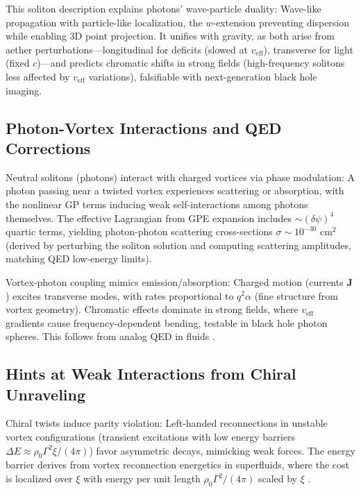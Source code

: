 \documentclass{article}
\begin{document}
This soliton description explains photons' wave-particle duality: Wave-like propagation with particle-like localization, the $w$-extension preventing dispersion while enabling 3D point projection. It unifies with gravity, as both arise from aether perturbations---longitudinal for deficits (slowed at $v_{\text{eff}}$), transverse for light (fixed $c$)---and predicts chromatic shifts in strong fields (high-frequency solitons less affected by $v_{\text{eff}}$ variations), falsifiable with next-generation black hole imaging.

\subsection{Photon-Vortex Interactions and QED Corrections}

Neutral solitons (photons) interact with charged vortices via phase modulation: A photon passing near a twisted vortex experiences scattering or absorption, with the nonlinear GP terms inducing weak self-interactions among photons themselves. The effective Lagrangian from GPE expansion includes $\sim (\delta \psi)^4$ quartic terms, yielding photon-photon scattering cross-sections $\sigma \sim 10^{-30}$ cm$^2$ (derived by perturbing the soliton solution and computing scattering amplitudes, matching QED low-energy limits).

Vortex-photon coupling mimics emission/absorption: Charged motion (currents $\mathbf{J}$) excites transverse modes, with rates proportional to $q^2 \alpha$ (fine structure from vortex geometry). Chromatic effects dominate in strong fields, where $v_{\text{eff}}$ gradients cause frequency-dependent bending, testable in black hole photon spheres. This follows from analog QED in fluids \cite{garay2000sonic}.

\subsection{Hints at Weak Interactions from Chiral Unraveling}

Chiral twists induce parity violation: Left-handed reconnections in unstable vortex configurations (transient excitations with low energy barriers $\Delta E \approx \rho_0 \Gamma^2 \xi /(4\pi)$) favor asymmetric decays, mimicking weak forces. The energy barrier derives from vortex reconnection energetics in superfluids, where the cost is localized over $\xi$ with energy per unit length $\rho_0 \Gamma^2 /(4\pi)$ scaled by $\xi$ \cite{bewley2008characterization}.
\end{document}
